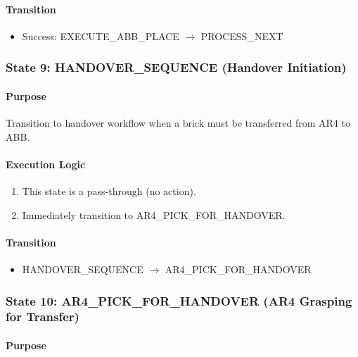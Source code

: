 \paragraph{Transition}

\begin{itemize}
    \item Success: EXECUTE\_ABB\_PLACE $\rightarrow$ PROCESS\_NEXT
\end{itemize}

\subsubsection{State 9: HANDOVER\_SEQUENCE (Handover Initiation)}
\label{state:handoversequence}

\paragraph{Purpose}

Transition to handover workflow when a brick must be transferred from AR4 to ABB.

\paragraph{Execution Logic}

\begin{enumerate}
    \item This state is a pass-through (no action).
    \item Immediately transition to AR4\_PICK\_FOR\_HANDOVER.
\end{enumerate}

\paragraph{Transition}

\begin{itemize}
    \item HANDOVER\_SEQUENCE $\rightarrow$ AR4\_PICK\_FOR\_HANDOVER
\end{itemize}

\subsubsection{State 10: AR4\_PICK\_FOR\_HANDOVER (AR4 Grasping for Transfer)}
\label{state:ar4pickhandover}

\paragraph{Purpose}

